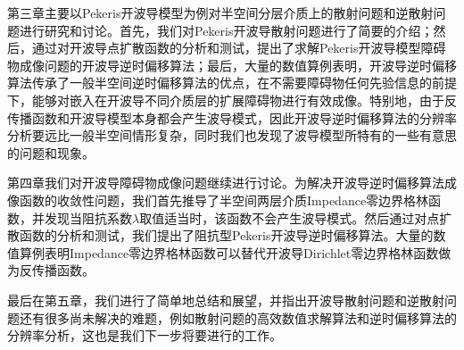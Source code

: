 第三章主要以Pekeris开波导模型为例对半空间分层介质上的散射问题和逆散射问题进行研究和讨论。首先，我们对Pekeris开波导散射问题进行了简要的介绍；然后，通过对开波导点扩散函数的分析和测试，提出了求解Pekeris开波导模型障碍物成像问题的开波导逆时偏移算法；最后，大量的数值算例表明，开波导逆时偏移算法传承了一般半空间逆时偏移算法的优点，在不需要障碍物任何先验信息的前提下，能够对嵌入在开波导不同介质层的扩展障碍物进行有效成像。特别地，由于反传播函数和开波导模型本身都会产生波导模式，因此开波导逆时偏移算法的分辨率分析要远比一般半空间情形复杂，同时我们也发现了波导模型所特有的一些有意思的问题和现象。


第四章我们对开波导障碍物成像问题继续进行讨论。为解决开波导逆时偏移算法成像函数的收敛性问题，我们首先推导了半空间两层介质Impedance零边界格林函数，并发现当阻抗系数$\lambda$取值适当时，该函数不会产生波导模式。然后通过对点扩散函数的分析和测试，我们提出了阻抗型Pekeris开波导逆时偏移算法。大量的数值算例表明Impedance零边界格林函数可以替代开波导Dirichlet零边界格林函数做为反传播函数。

最后在第五章，我们进行了简单地总结和展望，并指出开波导散射问题和逆散射问题还有很多尚未解决的难题，例如散射问题的高效数值求解算法和逆时偏移算法的分辨率分析，这也是我们下一步将要进行的工作。

